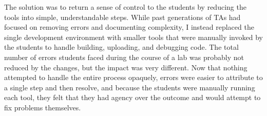 \documentclass[11pt]{article} %
\begin{document}
The solution was to return a sense of control to the students by
reducing the tools into simple, understandable steps. While past generations of
TAs had focused on removing errors and documenting complexity, I instead
replaced the single development environment with smaller tools that were
manually invoked by the students to handle building, uploading, and debugging
code. The total number of errors students faced during the course of a lab was
probably not reduced by the changes, but the impact was very different. Now
that nothing attempted to handle the entire process opaquely, errors were
easier to attribute to a single step and then resolve, and because the students
were manually running each tool, they felt that they had agency over the
outcome and would attempt to fix problems themselves.
\end{document}
